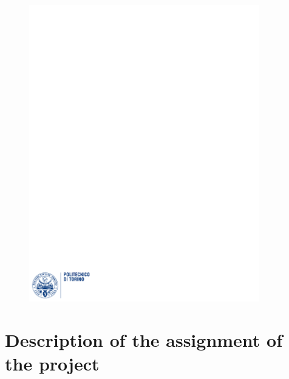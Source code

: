 \documentclass[12pt]{article}
\begin{document}
\begin{figure}
  \centering
  \includegraphics[width=10cm]{images/polito.pdf}
\end{figure}

\maketitle

\newpage
\tableofcontents

\newpage
\section{Description of the assignment of the project}
\end{document}
